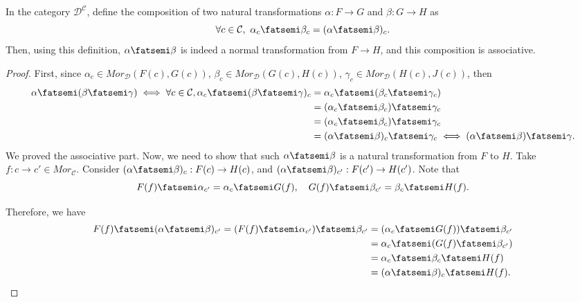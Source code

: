 \begin{proposition}
	In the category $\mathcal D^{\mathcal C}$, define the composition of two natural
	transformations $\alpha:F\to G$ and $\beta:G\to H$ as
	\begin{displaymath}
		\forall c \in \mathcal C, \ \alpha_c \fatsemi \beta_c = (\alpha \fatsemi \beta)_c.
	\end{displaymath}
	Then, using this definition, $\alpha \fatsemi \beta$ is indeed a normal transformation
	from $F \to H$, and this composition is associative.
\end{proposition}
\begin{proof}
	First, since
	$\alpha_c \in Mor_\mathcal D (F(c),G(c))$,
	$\beta_c \in Mor_\mathcal D (G(c),H(c))$,
	$\gamma_c \in Mor_\mathcal D (H(c),J(c))$,
	then
	\begin{align*}
		\alpha \fatsemi (\beta \fatsemi \gamma) \iff
		\forall c \in \mathcal C, \alpha_c \fatsemi (\beta \fatsemi \gamma)_c & =
		\alpha_c \fatsemi (\beta_c \fatsemi \gamma_c)                             \\&=
		(\alpha_c \fatsemi \beta_c) \fatsemi \gamma_c                             \\&=
		(\alpha_c \fatsemi \beta_c) \fatsemi \gamma_c                             \\&=
		(\alpha \fatsemi \beta)_c \fatsemi \gamma_c
		\iff (\alpha \fatsemi \beta) \fatsemi \gamma.
	\end{align*}
	We proved the associative part. Now, we need to show that such $\alpha \fatsemi \beta$
	is a natural transformation from $F$ to $H$. Take $f:c\to c' \in Mor_\mathcal C$.
	Consider $(\alpha \fatsemi \beta)_{c}:F(c) \to H(c)$, and
	$(\alpha\fatsemi \beta)_{c'}:F(c') \to H(c')$. Note that
	\begin{displaymath}
		F(f) \fatsemi \alpha_{c'} = \alpha_{c} \fatsemi G(f), \quad
		G(f) \fatsemi \beta_{c'} = \beta_{c} \fatsemi H(f).
	\end{displaymath}

	Therefore, we have
	\begin{align*}
		F(f) \fatsemi (\alpha\fatsemi \beta)_{c'} =
		(F(f) \fatsemi \alpha_{c'}) \fatsemi \beta_{c'} & =
		(\alpha_c \fatsemi G(f)) \fatsemi \beta_{c'}        \\&=
		\alpha_c \fatsemi (G(f) \fatsemi \beta_{c'})        \\&=
		\alpha_c \fatsemi \beta_c \fatsemi H(f)             \\&=
		(\alpha \fatsemi \beta)_c \fatsemi H(f).
	\end{align*}
\end{proof}

